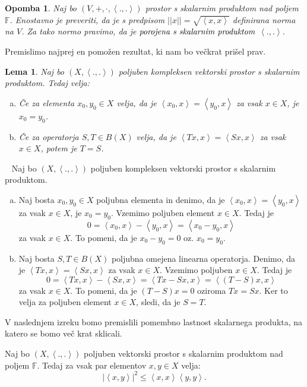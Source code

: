 \documentclass[12pt,a4paper,oneside,fleqn,openany]{book}
\newtheorem{lema}[izrek]{Lema}
\newtheorem{opomba}[izrek]{Opomba}
\newcommand{\eopf}{\raisebox{0.8ex}{\framebox{}}} %
\newenvironment{dokaz}%
{\noindent{\bf Dokaz.}\ }%
{\hfill\eopf\par\bigskip}%
\newcommand{\F}{\mathbb{F}}
\newcommand{\abs}[1]{\ensuremath{\lvert #1 \rvert}}
\newcommand{\norm}[1]{\abs{\abs{#1}}}
\newcommand{\pojem}[1]{\ensuremath{\emph{#1}}}
\newcommand{\Sp}[2]{\ensuremath{\left<#1, #2\right>}}
\begin{document}
\begin{opomba}
	\label{opomb:ScalProd}
	Naj bo $(V, +, \cdot, \Sp{.}{.})$ prostor s skalarnim produktom nad poljem $\F$. Enostavno je preveriti, da je s predpisom $\norm{x} = \sqrt{\Sp{x}{x}}$ definirana norma na $V$. Za tako normo pravimo, da je \pojem{porojena s skalarnim produktom} $\Sp{.}{.}$.
\end{opomba}
Premislimo najprej en pomožen rezultat, ki nam bo večkrat prišel prav.
\begin{lema}
	\label{lem:scalprodopenak}
	Naj bo $(X, \Sp{.}{.})$ poljuben kompleksen vektorski prostor s skalarnim produktom. Tedaj velja: \begin{enumerate}[a)]
		\item Če za elementa $x_0, y_0\in X$ velja, da je $\Sp{x_0}{x}=\Sp{y_0}{x}$ za vsak $x\in X$, je $x_0=y_0$.
		\item Če za operatorja $S, T \in B(X)$ velja, da je $\Sp{Tx}{x} = \Sp{Sx}{x}$ za vsak $x\in X$, potem je $T = S$.
	\end{enumerate} 
\end{lema}
\begin{dokaz}
	Naj bo $(X, \Sp{.}{.})$ poljuben kompleksen vektorski prostor s skalarnim produktom. \begin{enumerate}[a)]
		\item Naj bosta $x_0, y_0\in X$ poljubna elementa in denimo, da je $\Sp{x_0}{x}=\Sp{y_0}{x}$ za vsak $x\in X$, je $x_0=y_0$. Vzemimo poljuben element $x\in X$. Tedaj je $$0=\Sp{x_0}{x}-\Sp{y_0}{x} = \Sp{x_0 - y_0}{x}$$ za vsak $x\in X$. To pomeni, da je $x_0-y_0=0$ oz. $x_0=y_0$.
		\item Naj bosta $S, T \in B(X)$ poljubna omejena linearna operatorja. Denimo, da je $\Sp{Tx}{x} = \Sp{Sx}{x}$ za vsak $x\in X$. Vzemimo poljuben $x\in X$. Tedaj je $$0=\Sp{Tx}{x}-\Sp{Sx}{x}=\Sp{Tx - Sx}{x}=\Sp{(T-S)x}{x}$$ za vsak $x\in X$. To pomeni, da je $(T-S)x = 0$ oziroma $Tx = Sx$. Ker to velja za poljuben element $x\in X$, sledi, da je $S=T$.
	\end{enumerate} 
\end{dokaz}
V naslednjem izreku bomo premislili pomembno lastnost skalarnega produkta, na katero se bomo več krat sklicali.
\begin{izrek}
	\label{izr:CSB}
	Naj bo $(X, \Sp{.}{.})$ poljuben vektorski prostor s skalarnim produktom nad poljem $\F$. Tedaj za vsak par elementov $x, y\in X$ velja: $$\abs{\Sp{x}{y}}^2 \leq \Sp{x}{x}\Sp{y}{y}.$$
\end{izrek}
\end{document}
